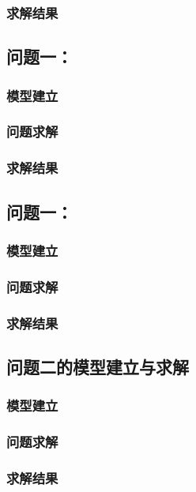 \documentclass[withoutpreface,bwprint]{cumcmthesis} %
\begin{document}
\subsubsection{求解结果}




\subsection{问题一：}
\subsubsection{模型建立}
\subsubsection{问题求解}
\subsubsection{求解结果}

\subsection{问题一：}
\subsubsection{模型建立}
\subsubsection{问题求解}
\subsubsection{求解结果}


\subsection{问题二的模型建立与求解}
\subsubsection{模型建立}
\subsubsection{问题求解}
\subsubsection{求解结果}
\end{document}
